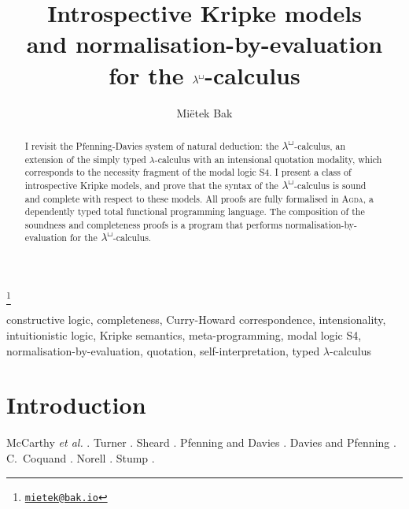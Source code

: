 \documentclass{entcs}
\newcommand{\lambdabox}{\lambda^{\mkern-1mu\sq\mkern-2mu}}
\renewcommand{\:}{\mathrel{:}}
\renewcommand{\;}{\mathbin{;}}
\newcommand{\sq}{\Box}
\begin{document}
\begin{frontmatter}


\title{Introspective Kripke models\\and normalisation-by-evaluation\\for the $\lambdabox$-calculus}

\author{Mi\"{e}tek Bak}

\address{Least Fixed Ltd, Cambridge, UK}

\thanks[email]{\href{mailto:mietek@bak.io}{\textnormal{\texttt{mietek@bak.io}}}}


\begin{abstract}
  I revisit the Pfenning-Davies system of natural deduction: the $\lambdabox$-calculus, an extension of the simply typed $\lambda$-calculus with an intensional quotation modality, which corresponds to the necessity fragment of the modal logic S4.  I present a class of introspective Kripke models, and prove that the syntax of the $\lambdabox$-calculus is sound and complete with respect to these models.  All proofs are fully formalised in \textsc{Agda}, a dependently typed total functional programming language.  The composition of the soundness and completeness proofs is a program that performs normalisation-by-evaluation for the $\lambdabox$-calculus.
\end{abstract}

\begin{keyword}
  constructive logic, completeness, Curry-Howard correspondence, intensionality, intuitionistic logic, Kripke semantics, meta-programming, modal logic S4, normalisation-by-evaluation, quotation, self-interpretation, typed $\lambda$-calculus
\end{keyword}

\end{frontmatter}




\section{Introduction}

McCarthy \emph{et al.} \cite{McCarthyAEHL62}.  Turner \cite{Turner04}.  Sheard \cite{Sheard01}.  Pfenning and Davies \cite{PfenningD01}.  Davies and Pfenning \cite{DaviesP01}.  C.~Coquand \cite{Coquand02}.  Norell \cite{Norell07}.  Stump \cite{Stump16}.


\end{document}
